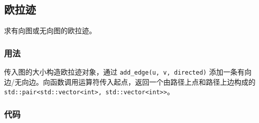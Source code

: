 \subsection{欧拉迹}

求有向图或无向图的欧拉迹。

\subsubsection{用法}

传入图的大小构造欧拉迹对象，通过 \lstinline{add_edge(u, v, directed)} 添加一条有向边/无向边。向函数调用运算符传入起点，返回一个由路径上点和路径上边构成的 \lstinline{std::pair<std::vector<int>, std::vector<int>>}。

\subsubsection{代码}



